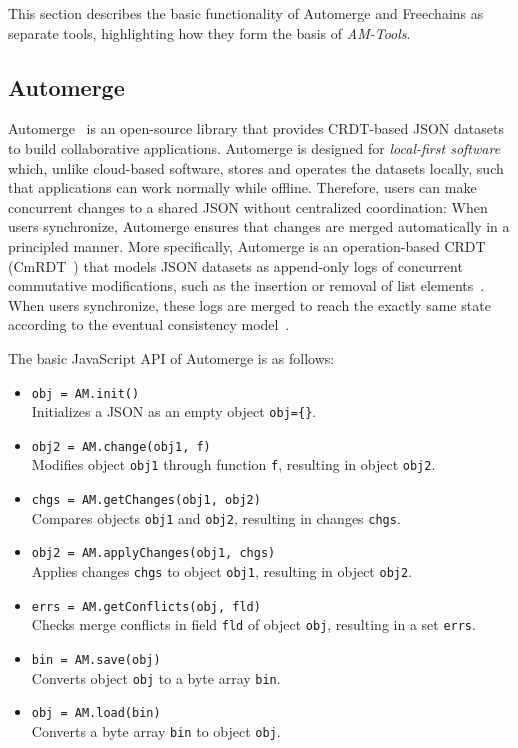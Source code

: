 \documentclass[12pt]{article}
\newcommand{\AMT}      {\emph{AM-Tools}\xspace}
\newcommand{\code}[1]  {\texttt{\footnotesize{#1}}}
\begin{document}
This section describes the basic functionality of Automerge and Freechains as
separate tools, highlighting how they form the basis of \AMT.

\subsection{Automerge}
\label{sec.both.automerge}

Automerge~\cite{kleppmann2018automerge} is an open-source library that provides
CRDT-based JSON datasets to build collaborative applications.
%
Automerge is designed for \emph{local-first software}~\cite{p2p.local} which,
unlike cloud-based software, stores and operates the datasets locally, such
that applications can work normally while offline.
%
Therefore, users can make concurrent changes to a shared JSON without
centralized coordination:
When users synchronize, Automerge ensures that changes are merged automatically
in a principled manner.
%
More specifically, Automerge is an operation-based CRDT
(CmRDT~\cite{p2p.crdts}) that models JSON datasets as append-only logs of
concurrent commutative modifications, such as the insertion or removal of list
elements~\cite{kleppmann2017conflict}.
%
When users synchronize, these logs are merged to reach the exactly same state
according to the eventual consistency model~\cite{p2p.sec}.

The basic JavaScript API of Automerge is as follows:

\begin{itemize}
\item \code{obj = AM.init()} \\
    Initializes a JSON as an empty object \code{obj=\{\}}.
\item \code{obj2 = AM.change(obj1, f)} \\
    Modifies object \code{obj1} through function \code{f}, resulting in
    object \code{obj2}.
\item \code{chgs = AM.getChanges(obj1, obj2)} \\
    Compares objects \code{obj1} and \code{obj2}, resulting in changes
    \code{chgs}.
\item \code{obj2 = AM.applyChanges(obj1, chgs)} \\
    Applies changes \code{chgs} to object \code{obj1}, resulting in object
    \code{obj2}.
\item \code{errs = AM.getConflicts(obj, fld)} \\
    Checks merge conflicts in field \code{fld} of object \code{obj}, resulting
    in a set \code{errs}.
\item \code{bin = AM.save(obj)} \\
    Converts object \code{obj} to a byte array \code{bin}.
\item \code{obj = AM.load(bin)} \\
    Converts a byte array \code{bin} to object \code{obj}.
\end{itemize}
\end{document}
